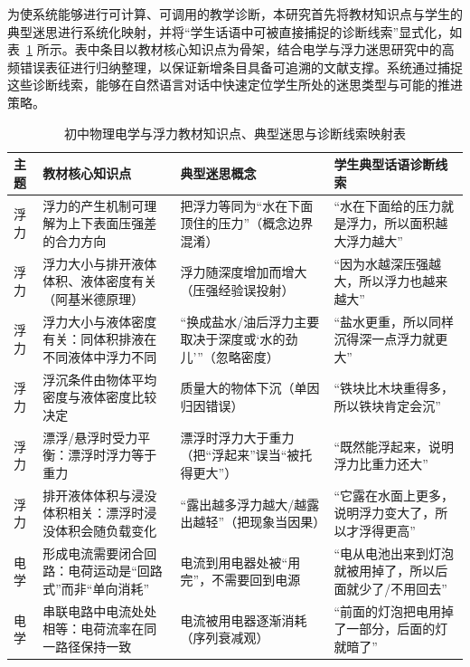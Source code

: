 为使系统能够进行可计算、可调用的教学诊断，本研究首先将教材知识点与学生的典型迷思进行系统化映射，并将“学生话语中可被直接捕捉的诊断线索”显式化，如表~\ref{tab:knowledge-misconception} 所示。表中条目以教材核心知识点为骨架，结合电学与浮力迷思研究中的高频错误表征进行归纳整理\cite{shipstone1984study,kucukozer2007misconceptions,unal2008changing,shen2017assessing}，以保证新增条目具备可追溯的文献支撑。系统通过捕捉这些诊断线索，能够在自然语言对话中快速定位学生所处的迷思类型与可能的推进策略。

\begin{table}[htbp]
    \centering
    \caption{初中物理电学与浮力教材知识点、典型迷思与诊断线索映射表}
    \label{tab:knowledge-misconception}
    \begin{tabular}{p{1.2cm}p{3.7cm}p{4.0cm}p{4.8cm}}
        \hline
        \textbf{主题} & \textbf{教材核心知识点} & \textbf{典型迷思概念} & \textbf{学生典型话语诊断线索} \\
        \hline
        浮力 & 浮力的产生机制可理解为上下表面压强差的合力方向 & 把浮力等同为“水在下面顶住的压力”（概念边界混淆）\cite{shen2017assessing} & “水在下面给的压力就是浮力，所以面积越大浮力越大” \\
        浮力 & 浮力大小与排开液体体积、液体密度有关（阿基米德原理） & 浮力随深度增加而增大（压强经验误投射）\cite{unal2008changing,shen2017assessing} & “因为水越深压强越大，所以浮力也越来越大” \\
        浮力 & 浮力大小与液体密度有关：同体积排液在不同液体中浮力不同 & “换成盐水/油后浮力主要取决于深度或‘水的劲儿’”（忽略密度）\cite{shen2017assessing} & “盐水更重，所以同样沉得深一点浮力就更大” \\
        浮力 & 浮沉条件由物体平均密度与液体密度比较决定 & 质量大的物体下沉（单因归因错误）\cite{unal2008changing} & “铁块比木块重得多，所以铁块肯定会沉” \\
        浮力 & 漂浮/悬浮时受力平衡：漂浮时浮力等于重力 & 漂浮时浮力大于重力（把“浮起来”误当“被托得更大”）\cite{shen2017assessing} & “既然能浮起来，说明浮力比重力还大” \\
        浮力 & 排开液体体积与浸没体积相关：漂浮时浸没体积会随负载变化 & “露出越多浮力越大/越露出越轻”（把现象当因果）\cite{unal2008changing} & “它露在水面上更多，说明浮力变大了，所以才浮得更高” \\
        \hline
        电学 & 形成电流需要闭合回路：电荷运动是“回路式”而非“单向消耗” & 电流到用电器处被“用完”，不需要回到电源\cite{shipstone1984study} & “电从电池出来到灯泡就被用掉了，所以后面就少了/不用回去” \\
        电学 & 串联电路中电流处处相等：电荷流率在同一路径保持一致 & 电流被用电器逐渐消耗（序列衰减观）\cite{shipstone1984study,kucukozer2007misconceptions} & “前面的灯泡把电用掉了一部分，后面的灯就暗了” \\

\end{tabular}
\end{table}
